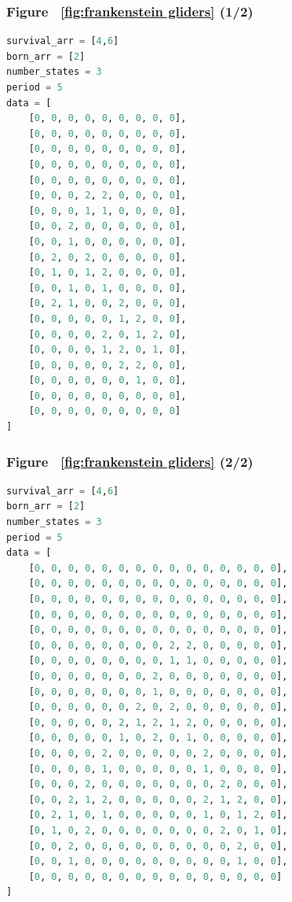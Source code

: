 \documentclass[12pt]{article}
\numberwithin{figure}{section} %
\begin{document}
\subsubsection{Figure ~\ref{fig:frankenstein gliders} (1/2)}
\label{subsubsection:frankenstein glider one}
\begin{lstlisting}[language = Python]
survival_arr = [4,6]
born_arr = [2]
number_states = 3
period = 5
data = [
    [0, 0, 0, 0, 0, 0, 0, 0, 0],
    [0, 0, 0, 0, 0, 0, 0, 0, 0],
    [0, 0, 0, 0, 0, 0, 0, 0, 0],
    [0, 0, 0, 0, 0, 0, 0, 0, 0],
    [0, 0, 0, 0, 0, 0, 0, 0, 0],
    [0, 0, 0, 2, 2, 0, 0, 0, 0],
    [0, 0, 0, 1, 1, 0, 0, 0, 0],
    [0, 0, 2, 0, 0, 0, 0, 0, 0],
    [0, 0, 1, 0, 0, 0, 0, 0, 0],
    [0, 2, 0, 2, 0, 0, 0, 0, 0],
    [0, 1, 0, 1, 2, 0, 0, 0, 0],
    [0, 0, 1, 0, 1, 0, 0, 0, 0],
    [0, 2, 1, 0, 0, 2, 0, 0, 0],
    [0, 0, 0, 0, 0, 1, 2, 0, 0],
    [0, 0, 0, 0, 2, 0, 1, 2, 0],
    [0, 0, 0, 0, 1, 2, 0, 1, 0],
    [0, 0, 0, 0, 0, 2, 2, 0, 0],
    [0, 0, 0, 0, 0, 0, 1, 0, 0],
    [0, 0, 0, 0, 0, 0, 0, 0, 0],
    [0, 0, 0, 0, 0, 0, 0, 0, 0]
]
\end{lstlisting}

\subsubsection{Figure ~\ref{fig:frankenstein gliders} (2/2)}
\label{subsubsection:frankenstein glider two}
\begin{lstlisting}[language = Python]
survival_arr = [4,6]
born_arr = [2]
number_states = 3
period = 5
data = [
    [0, 0, 0, 0, 0, 0, 0, 0, 0, 0, 0, 0, 0, 0, 0],
    [0, 0, 0, 0, 0, 0, 0, 0, 0, 0, 0, 0, 0, 0, 0],
    [0, 0, 0, 0, 0, 0, 0, 0, 0, 0, 0, 0, 0, 0, 0],
    [0, 0, 0, 0, 0, 0, 0, 0, 0, 0, 0, 0, 0, 0, 0],
    [0, 0, 0, 0, 0, 0, 0, 0, 0, 0, 0, 0, 0, 0, 0],
    [0, 0, 0, 0, 0, 0, 0, 0, 2, 2, 0, 0, 0, 0, 0],
    [0, 0, 0, 0, 0, 0, 0, 0, 1, 1, 0, 0, 0, 0, 0],
    [0, 0, 0, 0, 0, 0, 0, 2, 0, 0, 0, 0, 0, 0, 0],
    [0, 0, 0, 0, 0, 0, 0, 1, 0, 0, 0, 0, 0, 0, 0],
    [0, 0, 0, 0, 0, 0, 2, 0, 2, 0, 0, 0, 0, 0, 0],
    [0, 0, 0, 0, 0, 2, 1, 2, 1, 2, 0, 0, 0, 0, 0],
    [0, 0, 0, 0, 0, 1, 0, 2, 0, 1, 0, 0, 0, 0, 0],
    [0, 0, 0, 0, 2, 0, 0, 0, 0, 0, 2, 0, 0, 0, 0],
    [0, 0, 0, 0, 1, 0, 0, 0, 0, 0, 1, 0, 0, 0, 0],
    [0, 0, 0, 2, 0, 0, 0, 0, 0, 0, 0, 2, 0, 0, 0],
    [0, 0, 2, 1, 2, 0, 0, 0, 0, 0, 2, 1, 2, 0, 0],
    [0, 2, 1, 0, 1, 0, 0, 0, 0, 0, 1, 0, 1, 2, 0],
    [0, 1, 0, 2, 0, 0, 0, 0, 0, 0, 0, 2, 0, 1, 0],
    [0, 0, 2, 0, 0, 0, 0, 0, 0, 0, 0, 0, 2, 0, 0],
    [0, 0, 1, 0, 0, 0, 0, 0, 0, 0, 0, 0, 1, 0, 0],
    [0, 0, 0, 0, 0, 0, 0, 0, 0, 0, 0, 0, 0, 0, 0]
]
\end{lstlisting}
\end{document}

